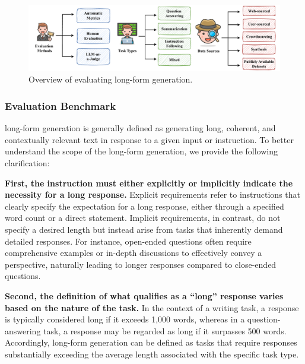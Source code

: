 \documentclass[11pt, a4paper, logo, copyright, nonumbering]{map}
\begin{document}
\begin{figure}
    \centering
    \includegraphics[width=\linewidth]{graphs/longformgeneration.pdf}
    \caption{Overview of evaluating long-form generation.}
    \label{fig:long-form-gene}
\end{figure}

\subsubsection{Evaluation Benchmark}
\label{sec:long-form-evaluation-benchmark}

long-form generation is generally defined as generating long, coherent, and contextually relevant text in response to a given input or instruction. To better understand the scope of the long-form generation, we provide the following clarification:

\noindent \textbf{First, the instruction must either explicitly or implicitly indicate the necessity for a long response.} 
Explicit requirements refer to instructions that clearly specify the expectation for a long response, either through a specified word count or a direct statement.
Implicit requirements, in contrast, do not specify a desired length but instead arise from tasks that inherently demand detailed responses. For instance, open-ended questions often require comprehensive examples or in-depth discussions to effectively convey a perspective, naturally leading to longer responses compared to close-ended questions.

\noindent \textbf{Second, the definition of what qualifies as a ``long'' response varies based on the nature of the task.}
In the context of a writing task, a response is typically considered long if it exceeds 1,000 words, whereas in a question-answering task, a response may be regarded as long if it surpasses 500 words. Accordingly, long-form generation can be defined as tasks that require responses substantially exceeding the average length associated with the specific task type.
\end{document}
